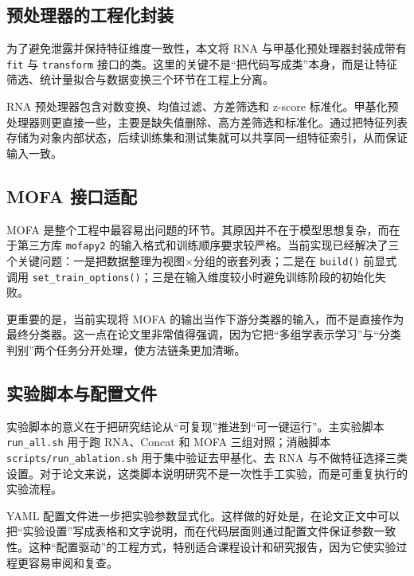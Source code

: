 \subsection{预处理器的工程化封装}

为了避免泄露并保持特征维度一致性，本文将 RNA 与甲基化预处理器封装成带有 \texttt{fit} 与 \texttt{transform} 接口的类。这里的关键不是“把代码写成类”本身，而是让特征筛选、统计量拟合与数据变换三个环节在工程上分离。

RNA 预处理器包含对数变换、均值过滤、方差筛选和 z-score 标准化。甲基化预处理器则更直接一些，主要是缺失值删除、高方差筛选和标准化。通过把特征列表存储为对象内部状态，后续训练集和测试集就可以共享同一组特征索引，从而保证输入一致。

\subsection{MOFA 接口适配}

MOFA 是整个工程中最容易出问题的环节。其原因并不在于模型思想复杂，而在于第三方库 \texttt{mofapy2} 的输入格式和训练顺序要求较严格。当前实现已经解决了三个关键问题：一是把数据整理为视图×分组的嵌套列表；二是在 \texttt{build()} 前显式调用 \texttt{set\_train\_options()}；三是在输入维度较小时避免训练阶段的初始化失败。

更重要的是，当前实现将 MOFA 的输出当作下游分类器的输入，而不是直接作为最终分类器。这一点在论文里非常值得强调，因为它把“多组学表示学习”与“分类判别”两个任务分开处理，使方法链条更加清晰。

\subsection{实验脚本与配置文件}

实验脚本的意义在于把研究结论从“可复现”推进到“可一键运行”。主实验脚本 \texttt{run\_all.sh} 用于跑 RNA、Concat 和 MOFA 三组对照；消融脚本 \texttt{scripts/run\_ablation.sh} 用于集中验证去甲基化、去 RNA 与不做特征选择三类设置。对于论文来说，这类脚本说明研究不是一次性手工实验，而是可重复执行的实验流程。

YAML 配置文件进一步把实验参数显式化。这样做的好处是，在论文正文中可以把“实验设置”写成表格和文字说明，而在代码层面则通过配置文件保证参数一致性。这种“配置驱动”的工程方式，特别适合课程设计和研究报告，因为它使实验过程更容易审阅和复查。
